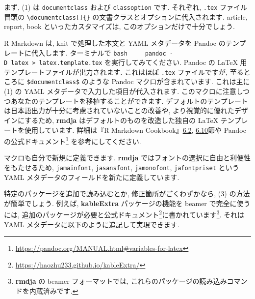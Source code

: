 \documentclass[
]{ltjsarticle}
\begin{document}
まず, (1) は \texttt{documentclass} および \texttt{classoption} です. それぞれ, \texttt{.tex} ファイル冒頭の \texttt{\textbackslash{}documentclass{[}{]}\{\}} の文書クラスとオプションに代入されます. article, report, book といったカスタマイズは, このオプションだけで十分でしょう.

R Markdown は, knit で処理した本文と YAML メタデータを Pandoc のテンプレートに代入します. ターミナルで
\texttt{bash\ \ \ \ \ pandoc\ -D\ latex\ \textgreater{}\ latex.template.tex}
を実行してみてください. Pandoc の LaTeX 用テンプレートファイルが出力されます. これはほぼ \texttt{.tex} ファイルですが, 至るところに \texttt{\$documentclass\$} のような Pandoc マクロが含まれています. これは主に (1) の YAML メタデータで入力した項目が代入されます. このマクロに注意しつつあなたのテンプレートを移植することができます. デフォルトのテンプレートは日本語出力が十分に考慮されていないことの改善や, より視覚的に優れたデザインにするため, \textbf{rmdja} はデフォルトのものを改造した独自の LaTeX テンプレートを使用しています. 詳細は『R Markdown Cookbook』\href{https://gedevan-aleksizde.github.io/rmarkdown-cookbook/latex-variables.html}{6.2}, \href{https://gedevan-aleksizde.github.io/rmarkdown-cookbook/latex-template.html}{6.10}節や Pandoc の公式ドキュメント\footnote{ \url{https://pandoc.org/MANUAL.html\#variables-for-latex}} を参考にしてください.

マクロも自分で新規に定義できます. \textbf{rmdja} ではフォントの選択に自由と利便性をもたせるため, \texttt{jamainfont}, \texttt{jasansfont}, \texttt{jamonofont}, \texttt{jafontpriset} という YAML メタデータのフィールドを新たに定義しています.

特定のパッケージを追加で読み込むとか, 修正箇所がごくわずかなら, (3) の方法が簡単でしょう. 例えば, \textbf{kableExtra} パッケージの機能を beamer で完全に使うには, 追加のパッケージが必要と公式ドキュメント\footnote{\url{https://haozhu233.github.io/kableExtra/}}に書かれています\footnote{\textbf{rmdja} の beamer フォーマットでは, これらのパッケージの読み込みコマンドを内蔵済みです.}. それは YAML メタデータに以下のように追記して実現できます.
\end{document}
